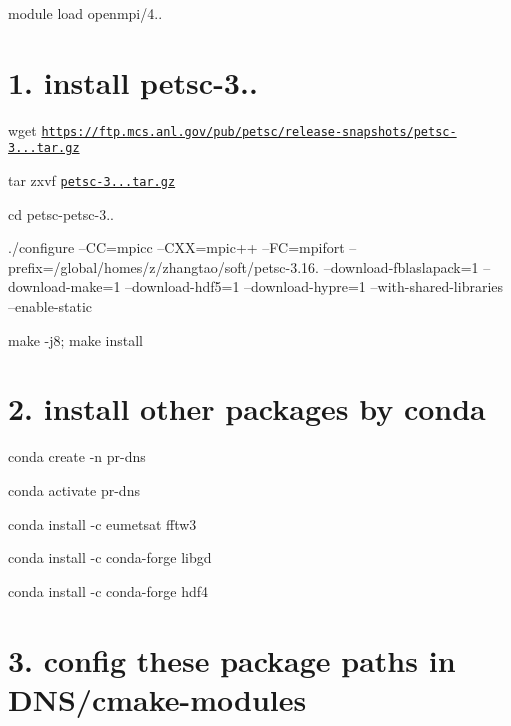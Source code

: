 module load openmpi/4..

\section*{1. install petsc-\/3..}


\begin{DoxyItemize}
\item wget \href{https://ftp.mcs.anl.gov/pub/petsc/release-snapshots/petsc-3.16.0.tar.gz}{\tt https\+://ftp.\+mcs.\+anl.\+gov/pub/petsc/release-\/snapshots/petsc-\/3...\+tar.\+gz}
\item tar zxvf \href{https://ftp.mcs.anl.gov/pub/petsc/release-snapshots/petsc-3.16.0.tar.gz}{\tt petsc-\/3...\+tar.\+gz}
\item cd petsc-\/petsc-\/3..
\item ./configure --CC=mpicc --C\+XX=mpic++ --FC=mpifort --prefix=/global/homes/z/zhangtao/soft/petsc-\/3.16. --download-\/fblaslapack=1 --download-\/make=1 --download-\/hdf5=1 --download-\/hypre=1 --with-\/shared-\/libraries --enable-\/static
\item make -\/j8; make install
\end{DoxyItemize}

\section*{2. install other packages by conda}


\begin{DoxyItemize}
\item conda create -\/n pr-\/dns
\item conda activate pr-\/dns
\item conda install -\/c eumetsat fftw3
\item conda install -\/c conda-\/forge libgd
\item conda install -\/c conda-\/forge hdf4
\end{DoxyItemize}

\section*{3. config these package paths in D\+N\+S/cmake-\/modules}


